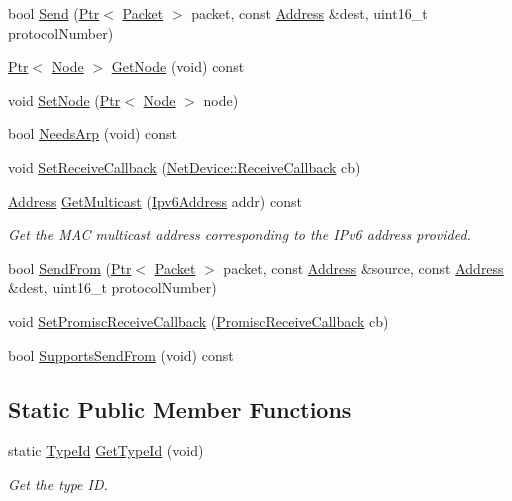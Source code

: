 \begin{DoxyCompactItemize}
bool \hyperlink{classns3_1_1WifiNetDevice_a14b6919a10da25e74e1c92554106b2c6}{Send} (\hyperlink{classns3_1_1Ptr}{Ptr}$<$ \hyperlink{classns3_1_1Packet}{Packet} $>$ packet, const \hyperlink{classns3_1_1Address}{Address} \&dest, uint16\+\_\+t protocol\+Number)
\item 
\hyperlink{classns3_1_1Ptr}{Ptr}$<$ \hyperlink{classns3_1_1Node}{Node} $>$ \hyperlink{classns3_1_1WifiNetDevice_a30a71d50a07c25bdef30157b86426ed8}{Get\+Node} (void) const 
\item 
void \hyperlink{classns3_1_1WifiNetDevice_ac8ee9ba01a7af99b7b79f11b3ecc287c}{Set\+Node} (\hyperlink{classns3_1_1Ptr}{Ptr}$<$ \hyperlink{classns3_1_1Node}{Node} $>$ node)
\item 
bool \hyperlink{classns3_1_1WifiNetDevice_a7be1791ad85ebd522bb79fbce4983467}{Needs\+Arp} (void) const 
\item 
void \hyperlink{classns3_1_1WifiNetDevice_a060a94017255c1937889a908a9dbb666}{Set\+Receive\+Callback} (\hyperlink{classns3_1_1NetDevice_ad5e5e1ca187472bc2ba99575d8def568}{Net\+Device\+::\+Receive\+Callback} cb)
\item 
\hyperlink{classns3_1_1Address}{Address} \hyperlink{classns3_1_1WifiNetDevice_a688e6e8cf8e14d5dbb22b21768853ceb}{Get\+Multicast} (\hyperlink{classns3_1_1Ipv6Address}{Ipv6\+Address} addr) const 
\begin{DoxyCompactList}\small\item\em Get the M\+AC multicast address corresponding to the I\+Pv6 address provided. \end{DoxyCompactList}\item 
bool \hyperlink{classns3_1_1WifiNetDevice_a7eb4a514b48646c22fcb97e6b38da3d2}{Send\+From} (\hyperlink{classns3_1_1Ptr}{Ptr}$<$ \hyperlink{classns3_1_1Packet}{Packet} $>$ packet, const \hyperlink{classns3_1_1Address}{Address} \&source, const \hyperlink{classns3_1_1Address}{Address} \&dest, uint16\+\_\+t protocol\+Number)
\item 
void \hyperlink{classns3_1_1WifiNetDevice_aeb3804754235564cf891b917646d53cb}{Set\+Promisc\+Receive\+Callback} (\hyperlink{classns3_1_1NetDevice_a427225795919f26c414bee2ea3f31ed2}{Promisc\+Receive\+Callback} cb)
\item 
bool \hyperlink{classns3_1_1WifiNetDevice_a4d62390fd29ae47d0cdf9ae0da15beb1}{Supports\+Send\+From} (void) const 
\end{DoxyCompactItemize}
\subsection*{Static Public Member Functions}
\begin{DoxyCompactItemize}
\item 
static \hyperlink{classns3_1_1TypeId}{Type\+Id} \hyperlink{classns3_1_1WifiNetDevice_a94194d4a4f27318dd13627ab9d8a2bce}{Get\+Type\+Id} (void)
\begin{DoxyCompactList}\small\item\em Get the type ID. \end{DoxyCompactList}\end{DoxyCompactItemize}
